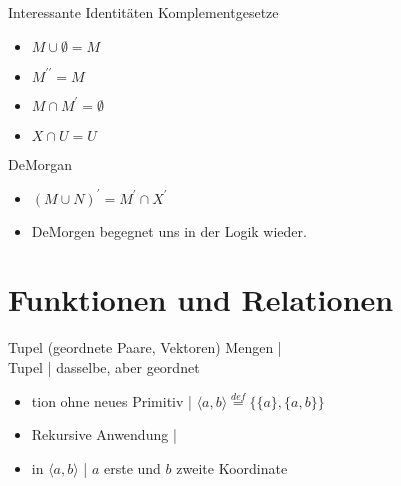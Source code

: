 \begin{frame}
  {Interessante Identitäten}
  \onslide<+->
  \onslide<+->
  Komplementgesetze\\
  \Halbzeile
  \begin{itemize}[<+->]
    \item $M\cup\emptyset=M$
    \item $M^{\prime\prime}=M$
    \item $M\cap M^{\prime}=\emptyset$
    \item $X\cap U=U$
  \end{itemize}
  \onslide<+->
  \Zeile
  DeMorgan\\
  \Halbzeile
  \begin{itemize}[<+->]
    \item $(M\cup N)^{\prime}=M^{\prime}\cap X^{\prime}$
    \item DeMorgen begegnet uns in der Logik wieder.
  \end{itemize}
\end{frame}

\section{Funktionen und Relationen}

\begin{frame}
  {Tupel (geordnete Paare, Vektoren)}
  \label{slide:tupel}
  \onslide<+->
  \onslide<+->
  Mengen |  \\
  \Viertelzeile
  \onslide<+->
  Tupel | dasselbe, aber \alert{geordnet} \\
  \Halbzeile
  \begin{itemize}[<+->]
    \item tion ohne neues Primitiv | \alert{$\langle a,b\rangle \stackrel{def}{=} \{\{a\},\{a,b\}\}$}
    \item Rekursive Anwendung | 
      \Halbzeile
    \item in $\langle a,b\rangle$ | $a$ \alert{erste} und $b$ \alert{zweite Koordinate}
  \end{itemize}
  \Halbzeile
\end{frame}

